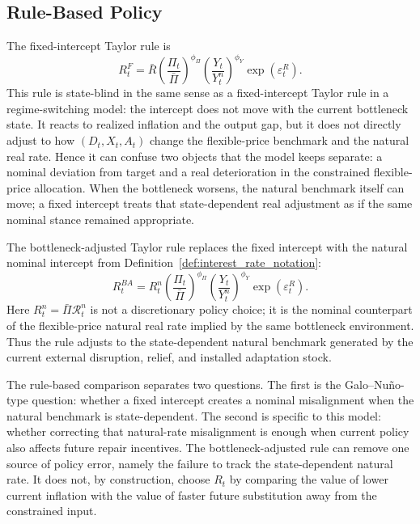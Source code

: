 ﻿\documentclass[12pt]{article}
\theoremstyle{remark}
\begin{document}
\subsection{Rule-Based Policy}

The fixed-intercept Taylor rule is
\begin{equation}
    R_t^{F}
    =
    \bar R
    \left(\frac{\Pi_t}{\bar\Pi}\right)^{\phi_\Pi}
    \left(\frac{Y_t}{Y_t^n}\right)^{\phi_Y}
    \exp(\varepsilon_t^R).
    \label{eq:fixed_taylor_rule}
\end{equation}
This rule is state-blind in the same sense as a fixed-intercept Taylor rule in a regime-switching
model: the intercept does not move with the current bottleneck state. It reacts to realized
inflation and the output gap, but it does not directly adjust to how $(D_t,X_t,A_t)$ change the
flexible-price benchmark and the natural real rate. Hence it can confuse two objects that the
model keeps separate: a nominal deviation from target and a real deterioration in the constrained
flexible-price allocation. When the bottleneck worsens, the natural benchmark itself can move; a
fixed intercept treats that state-dependent real adjustment as if the same nominal stance remained
appropriate.

The bottleneck-adjusted Taylor rule replaces the fixed intercept with the natural nominal
intercept from Definition~\ref{def:interest_rate_notation}:
\begin{equation}
    R_t^{BA}
    =
    R_t^n
    \left(\frac{\Pi_t}{\bar\Pi}\right)^{\phi_\Pi}
    \left(\frac{Y_t}{Y_t^n}\right)^{\phi_Y}
    \exp(\varepsilon_t^R).
    \label{eq:bottleneck_adjusted_taylor_rule}
\end{equation}
Here $R_t^n=\bar\Pi\mathcal R_t^n$ is not a discretionary policy choice; it is the nominal
counterpart of the flexible-price natural real rate implied by the same bottleneck environment.
Thus the rule adjusts to the state-dependent natural benchmark generated by the current external
disruption, relief, and installed adaptation stock.


The rule-based comparison separates two questions. The first is the Galo--Nu\~no-type question:
whether a fixed intercept creates a nominal misalignment when the natural benchmark is
state-dependent. The second is specific to this model: whether correcting that natural-rate
misalignment is enough when current policy also affects future repair incentives. The
bottleneck-adjusted rule can remove one source of policy error, namely the failure to track the
state-dependent natural rate. It does not, by construction, choose $R_t$ by comparing the value of
lower current inflation with the value of faster future substitution away from the constrained
input.
\end{document}
